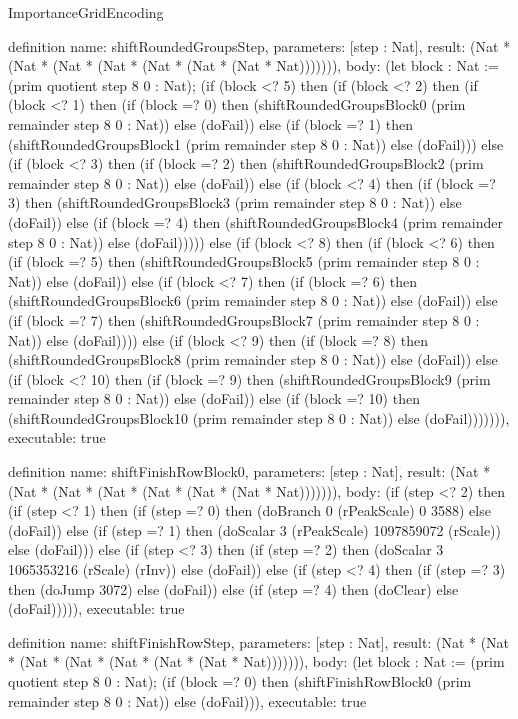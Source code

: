 \begin{lexlean}{ImportanceGridEncoding}
\begin{semanticmodule}
definition{
  name: shiftRoundedGroupsStep,
  parameters: [step : Nat],
  result: (Nat * (Nat * (Nat * (Nat * (Nat * (Nat * (Nat * Nat))))))),
  body: (let block : Nat := (prim quotient step 8 0 : Nat); (if (block <? 5) then
      (if (block <? 2) then
      (if (block <? 1) then
      (if (block =? 0) then (shiftRoundedGroupsBlock0 (prim remainder step 8 0 : Nat)) else (doFail)) else
      (if (block =? 1) then (shiftRoundedGroupsBlock1 (prim remainder step 8 0 : Nat)) else (doFail))) else
      (if (block <? 3) then
      (if (block =? 2) then (shiftRoundedGroupsBlock2 (prim remainder step 8 0 : Nat)) else (doFail)) else
      (if (block <? 4) then
      (if (block =? 3) then (shiftRoundedGroupsBlock3 (prim remainder step 8 0 : Nat)) else (doFail)) else
      (if (block =? 4) then (shiftRoundedGroupsBlock4 (prim remainder step 8 0 : Nat)) else (doFail))))) else
      (if (block <? 8) then
      (if (block <? 6) then
      (if (block =? 5) then (shiftRoundedGroupsBlock5 (prim remainder step 8 0 : Nat)) else (doFail)) else
      (if (block <? 7) then
      (if (block =? 6) then (shiftRoundedGroupsBlock6 (prim remainder step 8 0 : Nat)) else (doFail)) else
      (if (block =? 7) then (shiftRoundedGroupsBlock7 (prim remainder step 8 0 : Nat)) else (doFail)))) else
      (if (block <? 9) then
      (if (block =? 8) then (shiftRoundedGroupsBlock8 (prim remainder step 8 0 : Nat)) else (doFail)) else
      (if (block <? 10) then
      (if (block =? 9) then (shiftRoundedGroupsBlock9 (prim remainder step 8 0 : Nat)) else (doFail)) else
      (if (block =? 10) then (shiftRoundedGroupsBlock10 (prim remainder step 8 0 : Nat)) else (doFail))))))),
  executable: true
}

definition{
  name: shiftFinishRowBlock0,
  parameters: [step : Nat],
  result: (Nat * (Nat * (Nat * (Nat * (Nat * (Nat * (Nat * Nat))))))),
  body: (if (step <? 2) then
      (if (step <? 1) then
      (if (step =? 0) then (doBranch 0 (rPeakScale) 0 3588) else (doFail)) else
      (if (step =? 1) then (doScalar 3 (rPeakScale) 1097859072 (rScale)) else (doFail))) else
      (if (step <? 3) then
      (if (step =? 2) then (doScalar 3 1065353216 (rScale) (rInv)) else (doFail)) else
      (if (step <? 4) then
      (if (step =? 3) then (doJump 3072) else (doFail)) else
      (if (step =? 4) then (doClear) else (doFail))))),
  executable: true
}

definition{
  name: shiftFinishRowStep,
  parameters: [step : Nat],
  result: (Nat * (Nat * (Nat * (Nat * (Nat * (Nat * (Nat * Nat))))))),
  body: (let block : Nat := (prim quotient step 8 0 : Nat); (if (block =? 0) then (shiftFinishRowBlock0 (prim remainder step 8 0 : Nat)) else (doFail))),
  executable: true
}


\end{semanticmodule}
\end{lexlean}
